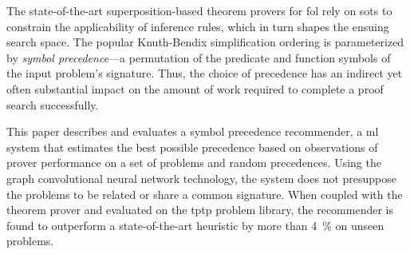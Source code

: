
The state-of-the-art superposition-based theorem provers for \acrlong{fol}
rely on \glspl{sot} to constrain the applicability of inference rules,
which in turn shapes the ensuing search space.
The popular Knuth-Bendix simplification ordering is parameterized by 
\emph{symbol precedence}---a permutation of the predicate and function symbols
of the input problem's signature.
Thus, the choice of precedence has an indirect yet often substantial impact
on the amount of work required to complete a proof search successfully.

This paper describes and evaluates a symbol precedence recommender,
a \acrlong{ml} system that estimates the best possible precedence
based on observations of prover performance on a set of problems and random precedences.
Using the graph convolutional neural network technology,
the system does not presuppose the problems to be related or share a common signature. 
When coupled with the theorem prover \Vampire{} and evaluated on the \acrshort{tptp} problem library,
the recommender is found to outperform a state-of-the-art heuristic by more than \SI{4}{\percent}
on unseen problems.




